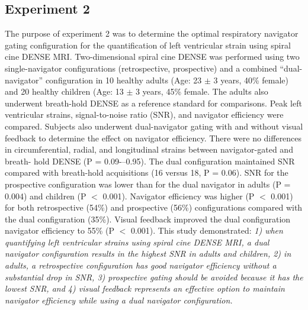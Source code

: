 \subsection{Experiment 2}
	The purpose of experiment 2 was to determine the optimal respiratory navigator gating configuration for the quantification of left ventricular strain using spiral cine DENSE MRI. Two-dimensional spiral cine DENSE was performed using two single-navigator configurations (retrospective, prospective) and a combined “dual-navigator” configuration in 10 healthy adults (Age: 23 $\pm$ 3 years, 40\% female) and 20 healthy children  (Age: 13 $\pm$ 3 years, 45\% female. The adults also underwent breath-hold DENSE as a reference standard for comparisons. Peak left ventricular strains, signal-to-noise ratio (SNR), and navigator efficiency were compared. Subjects also underwent dual-navigator gating with and without visual feedback to determine the effect on navigator efficiency. There were no differences in circumferential, radial, and longitudinal strains between navigator-gated and breath- hold DENSE (P = 0.09-–0.95). The dual configuration maintained SNR compared with breath-hold acquisitions (16 versus 18, P = 0.06). SNR for the prospective configuration was lower than for the dual navigator in adults (P = 0.004) and children (P $<$ 0.001). Navigator efficiency was higher (P $<$ 0.001) for both retrospective (54\%) and prospective (56\%) configurations compared with the dual configuration (35\%). Visual feedback improved the dual configuration navigator efficiency to 55\% (P $<$ 0.001). This study demonstrated: \textit{1) when quantifying left ventricular strains using spiral cine DENSE MRI, a dual navigator configuration results in the highest SNR in adults and children, 2) in adults, a retrospective configuration has good navigator efficiency without a substantial drop in SNR, 3) prospective gating should be avoided because it has the lowest SNR, and 4) visual feedback represents an effective option to maintain navigator efficiency while using a dual navigator configuration.}
	
